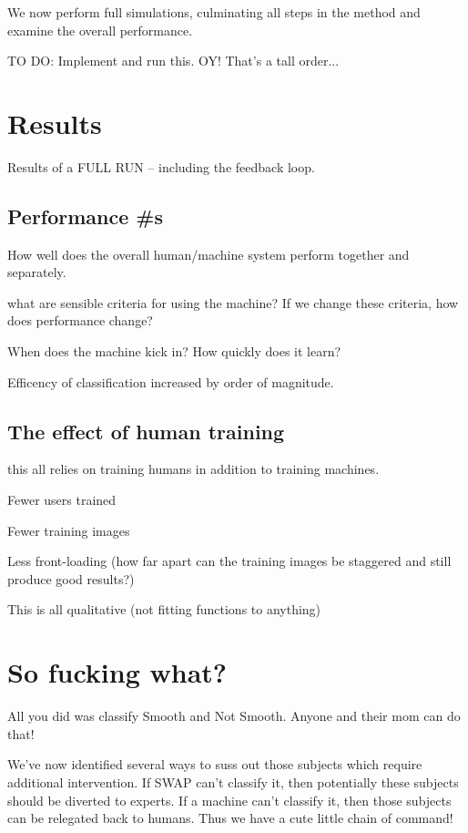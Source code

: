 \documentclass[twocolumn]{aastex6}
\begin{document}
We now perform full simulations, culminating all steps in the method and examine 
the overall performance. 

{\color{red} TO DO: Implement and run this. OY! That's a tall order...}

\section{Results}
Results of a FULL RUN -- including the feedback loop. 


\subsection{Performance \#s}
How well does the overall human/machine system perform together and separately. 

what are sensible criteria for using the machine? If we change these criteria, how does performance change? 

When does the machine kick in? How quickly does it learn? 

Efficency of classification increased by order of magnitude. 


\subsection{The effect of human training}

this all relies on training humans in addition to training machines. 

Fewer users trained

Fewer training images

Less front-loading (how far apart can the training images be staggered and still produce good results?)

This is all qualitative (not fitting functions to anything)

\section{So fucking what?}
All you did was classify Smooth and Not Smooth. Anyone and their mom can do that!


We've now identified several ways to suss out those subjects which require 
additional intervention. If SWAP can't classify it, then potentially these subjects 
should be diverted to experts. If a machine can't classify it, then those subjects
can be relegated back to humans. Thus we have a cute little chain of command!
\end{document}
